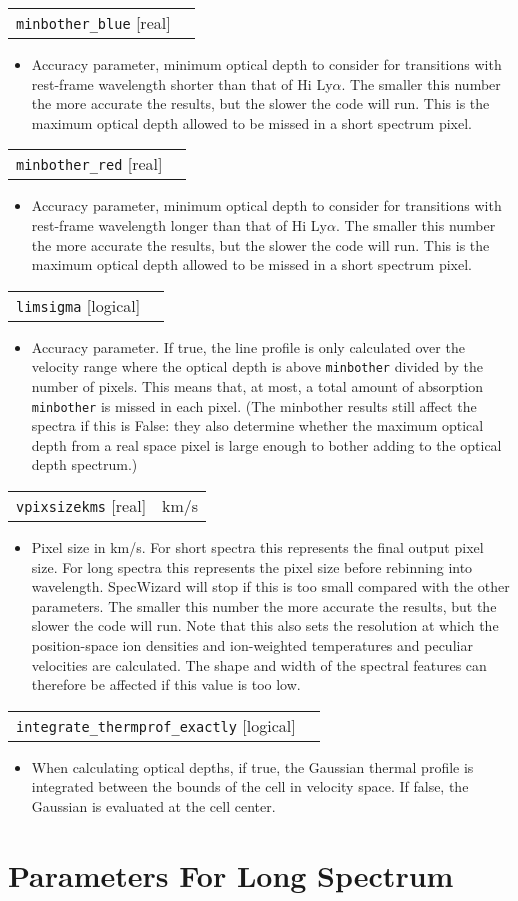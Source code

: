 \documentclass{report}
\makeatletter
\newcommand{\paramdefinition}[3]{
\begin{tabular*}{\textwidth}{l@{\extracolsep{\fill}}r}
		{\tt #1} [{\sc #2}]& #3 \\
\end{tabular*}}
\newcommand{\paramdescription}[1]{
\begin{itemize}
\item #1
\end{itemize}\vspace{0.2cm}}
\makeatother
\begin{document}
\paramdefinition{minbother\_blue}{real}{}
\paramdescription{Accuracy parameter, minimum optical depth to consider for transitions with rest-frame wavelength shorter than that of H{\sc i} Ly$\alpha$.  The smaller this number the more accurate the results, but the slower the code will run. This is the maximum optical depth allowed to be missed in a short spectrum pixel.}

\paramdefinition{minbother\_red}{real}{}
\paramdescription{Accuracy parameter, minimum optical depth to consider for transitions with rest-frame wavelength longer than that of H{\sc i} Ly$\alpha$.  The smaller this number the more accurate the results, but the slower the code will run. This is the maximum optical depth allowed to be missed in a short spectrum pixel.}

\paramdefinition{limsigma}{logical}{}
\paramdescription{Accuracy parameter. If true, the line profile is only calculated over the velocity range where the optical depth is above {\tt minbother} divided by the number of pixels. This means that, at most, a total amount of absorption {\tt minbother} is missed in each pixel. (The minbother results still affect the spectra if this is False: they also determine whether the maximum optical depth from a real space pixel is large enough to bother adding to the optical depth spectrum.)}

\paramdefinition{vpixsizekms}{real}{km/s}
\paramdescription{Pixel size in km/s.  For short spectra this represents the final output pixel size.  For long spectra this represents the pixel size before rebinning into wavelength. SpecWizard will stop if this is too small compared with the other parameters. The smaller this number the more accurate the results, but the slower the code will run. Note that this also sets the resolution at which the position-space ion densities and ion-weighted temperatures and peculiar velocities are calculated. The shape and width of the spectral features can therefore be affected if this value is too low.}

\paramdefinition{integrate\_thermprof\_exactly}{logical}{}
\paramdescription{When calculating optical depths, if true, the Gaussian thermal profile is integrated between the bounds of the cell in velocity space. If false, the Gaussian is evaluated at the cell center.}


\section{Parameters For Long Spectrum}
\end{document}
